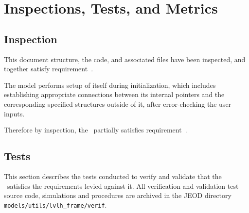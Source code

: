 \chapter{Inspections, Tests, and Metrics}\label{ch:ivv}

\section{Inspection}\label{sec:inspect}

\label{inspect:TLI}
This document structure, the code, and associated files have been inspected,
and together satisfy requirement~.

\label{inspect:design}
The model performs setup of itself during initialization, which includes
establishing appropriate connections between its internal pointers and the
corresponding specified structures outside of it, after error-checking the
user inputs.

Therefore by inspection, the \LvlhFrameDesc\ partially satisfies
requirement~.


\section{Tests}\label{sec:tests}
This section describes the tests conducted to verify and validate
that the \LvlhFrameDesc\ satisfies the requirements levied against it.
All verification and validation test source code, simulations and procedures
are archived in the JEOD directory
{\tt models/utils/lvlh\_frame/verif}.\relax


